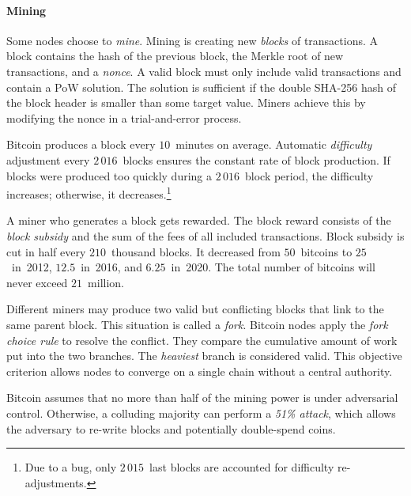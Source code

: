 \paragraph{Mining}

Some nodes choose to \textit{mine}.
Mining is creating new \textit{blocks} of transactions.
A block contains the hash of the previous block, the Merkle root of new transactions, and a \textit{nonce}.
A valid block must only include valid transactions and contain a PoW solution.
The solution is sufficient if the double SHA-256 hash of the block header is smaller than some target value.
Miners achieve this by modifying the nonce in a trial-and-error process.

Bitcoin produces a block every $10$~minutes on average.
Automatic \textit{difficulty} adjustment every  $2\,016$~blocks ensures the constant rate of block production.
If blocks were produced too quickly during a $2\,016$~block period, the difficulty increases; otherwise, it decreases.\footnote{Due to a bug, only $2\,015$~last blocks are accounted for difficulty re-adjustments.}

A miner who generates a block gets rewarded.
The block reward consists of the \textit{block subsidy} and the sum of the fees of all included transactions.
Block subsidy is cut in half every $210$~thousand blocks.
It decreased from $50$~bitcoins to $25$~in~2012, $12.5$~in~2016, and $6.25$~in~2020.
The total number of bitcoins will never exceed $21$~million.

Different miners may produce two valid but conflicting blocks that link to the same parent block.
This situation is called a \textit{fork}.
Bitcoin nodes apply the \textit{fork choice rule} to resolve the conflict.
They compare the cumulative amount of work put into the two branches.
The \textit{heaviest} branch is considered valid.
This objective criterion allows nodes to converge on a single chain without a central authority.

Bitcoin assumes that no more than half of the mining power is under adversarial control.
Otherwise, a colluding majority can perform a \textit{51\% attack}, which allows the adversary to re-write blocks and potentially double-spend coins.

